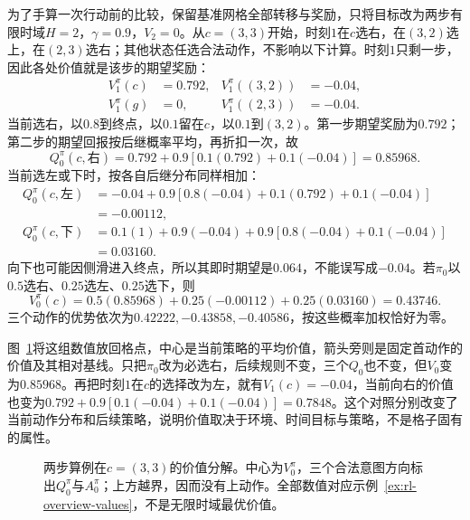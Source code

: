 \begin{example}[随机网格中的两步价值]
  \label{ex:rl-overview-values}
  为了手算一次行动前的比较，保留基准网格全部转移与奖励，只将目标改为两步有限时域$H=2$，$\gamma=0.9$，$V_2=0$。从$c=(3,3)$开始，时刻$1$在$c$选右，在$(3,2)$选上，在$(2,3)$选右；其他状态任选合法动作，不影响以下计算。时刻$1$只剩一步，因此各处价值就是该步的期望奖励：
  \[
  \begin{aligned}
    V_1^\pi(c)&=0.792,& V_1^\pi((3,2))&=-0.04,\\
    V_1^\pi(g)&=0,& V_1^\pi((2,3))&=-0.04.
  \end{aligned}
  \]
  当前选右，以$0.8$到终点，以$0.1$留在$c$，以$0.1$到$(3,2)$。第一步期望奖励为$0.792$；第二步的期望回报按后继概率平均，再折扣一次，故
  \[
    Q_0^\pi(c,\text{右})
     =0.792+0.9[0.1(0.792)+0.1(-0.04)]=0.85968.
  \]
  当前选左或下时，按各自后继分布同样相加：
  \[
  \begin{aligned}
    Q_0^\pi(c,\text{左})
      &=-0.04+0.9[0.8(-0.04)+0.1(0.792)+0.1(-0.04)]\\
      &=-0.00112,\\
    Q_0^\pi(c,\text{下})
      &=0.1(1)+0.9(-0.04)+0.9[0.8(-0.04)+0.1(-0.04)]\\
      &=0.03160.
  \end{aligned}
  \]
  向下也可能因侧滑进入终点，所以其即时期望是$0.064$，不能误写成$-0.04$。若$\pi_0$以$0.5$选右、$0.25$选左、$0.25$选下，则
  \[
    V_0^\pi(c)=0.5(0.85968)+0.25(-0.00112)+0.25(0.03160)
              =0.43746.
  \]
  三个动作的优势依次为$0.42222,-0.43858,-0.40586$，按这些概率加权恰好为零。
\end{example}

图~\ref{fig:rl-overview-values}将这组数值放回格点，中心是当前策略的平均价值，箭头旁则是固定首动作的价值及其相对基线。只把$\pi_0$改为必选右，后续规则不变，三个$Q_0$也不变，但$V_0$变为$0.85968$。再把时刻$1$在$c$的选择改为左，就有$V_1(c)=-0.04$，当前向右的价值也变为$0.792+0.9[0.1(-0.04)+0.1(-0.04)]=0.7848$。这个对照分别改变了当前动作分布和后续策略，说明价值取决于环境、时间目标与策略，不是格子固有的属性。

\begin{figure}[htbp]
  \centering
  
  \caption{两步算例在$c=(3,3)$的价值分解。中心为$V_0^\pi$，三个合法意图方向标出$Q_0^\pi$与$A_0^\pi$；上方越界，因而没有上动作。全部数值对应示例~\ref{ex:rl-overview-values}，不是无限时域最优价值。}
  \label{fig:rl-overview-values}
\end{figure}

